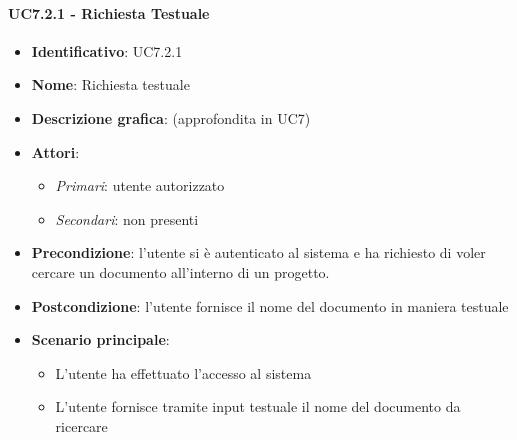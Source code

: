 \paragraph{UC7.2.1 - Richiesta Testuale}
\begin{itemize}
   \item \textbf{Identificativo}: UC7.2.1
   \item \textbf{Nome}: Richiesta testuale
   \item \textbf{Descrizione grafica}: (approfondita in UC7)
   \item \textbf{Attori}:
   \begin{itemize} 
       \item \textit{Primari}: utente autorizzato
       \item \textit{Secondari}: non presenti
   \end{itemize}
       \item \textbf{Precondizione}: l'utente si è autenticato al sistema e ha richiesto di voler cercare un documento all'interno di un progetto.
       \item \textbf{Postcondizione}: l'utente fornisce il nome del documento in maniera testuale
    \item \textbf{Scenario principale}: 
       \begin{itemize}
           \item L'utente ha effettuato l'accesso al sistema 
           \item L'utente fornisce tramite input testuale il nome del documento da ricercare
       \end{itemize}
\end{itemize}

